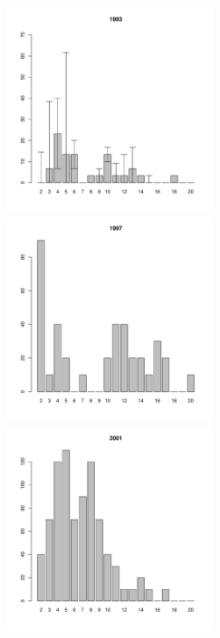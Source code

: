 \begin{figure}[hp]
\begin{minipage}[b]{.3\linewidth}
\begin{center}
	\end{center}
	\end{minipage}
	\begin{minipage}[b]{.3\linewidth}
	\begin{center}
	\includegraphics[width=60mm]{../White_Sea/Luvenga_Goreliy/low2_1993_.pdf}
	\end{center}
	\end{minipage}
	\hfil %
	\begin{minipage}[b]{.3\linewidth}
	\begin{center}
	\includegraphics[width=60mm]{../White_Sea/Luvenga_Goreliy/low2_1997_.pdf}
	\end{center}
	\end{minipage}
	\hfil %
	\begin{minipage}[b]{.3\linewidth}
	\begin{center}
	\includegraphics[width=60mm]{../White_Sea/Luvenga_Goreliy/low2_2001_.pdf}
	\end{center}
	\end{minipage}



\end{figure}

